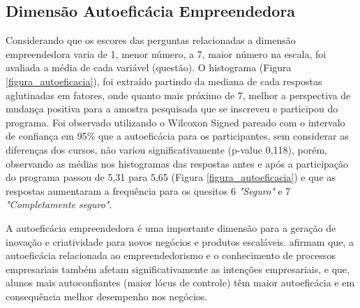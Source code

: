 





\subsection{Dimensão Autoeficácia Empreendedora}

Considerando que os escores das perguntas relacionadas a dimensão empreendedora varia de 1, menor número, a 7, maior número na escala, foi avaliada a média de cada variável (questão). O histograma (Figura \ref{figura_autoeficacia}), foi extraído partindo da mediana de cada respostas aglutinadas em fatores, onde quanto mais próximo de 7, melhor a perspectiva de mudança positiva para a amostra pesquisada que se inscreveu e participou do programa. Foi observado utilizando o Wilcoxon Signed pareado com o intervalo de confiança em 95\% que a autoeficácia para os participantes, sem considerar as diferenças dos cursos, não variou significativamente (p-value 0,118), porém, observando as médias nos histogramas das respostas antes e após a participação do programa passou de 5,31 para 5,65 (Figura \ref{figura_autoeficacia}) e que as respostas aumentaram a frequência para os quesitos 6 \textit{"Seguro"} e 7 \textit{"Completamente seguro"}.

A autoeficácia empreendedora é uma importante dimensão para a geração de inovação e criatividade para novos negócios e produtos escaláveis.  afirmam que, a autoeficácia relacionada ao empreendedorismo e o conhecimento de processos empresariais também afetam significativamente as intenções empresariais, e que, alunos mais autoconfiantes (maior lócus de controle) têm maior autoeficácia e em consequência melhor desempenho nos negócios.


